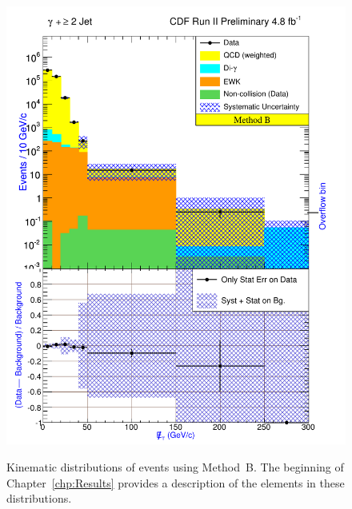 \begin{figure}[h!]
\centering
{\includegraphics[keepaspectratio=true, scale=0.7]{G30Jets_MtdB_plot2_Met.pdf}}
\caption{Kinematic distributions of \photwojet events using \mbox{Method B}. The beginning of Chapter~\ref{chp:Results} provides a description of the elements in these distributions.}
\label{fig:pjMtdBSetFour}
\end{figure}
\clearpage


